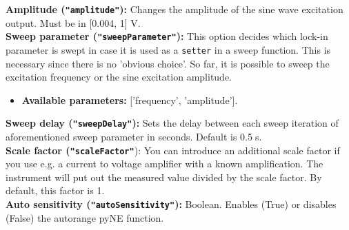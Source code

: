\textbf{\textsf{Amplitude} (\texttt{"amplitude"}):} Changes the amplitude of the sine wave excitation output. Must be in [0.004, 1] V.\\  
\textbf{\textsf{Sweep parameter} (\texttt{"sweepParameter"}):} This option decides which lock-in parameter is swept in case it is used as a \texttt{setter} in a sweep function. This is necessary since there is no 'obvious choice'. So far, it is possible to sweep the excitation frequency or the sine excitation amplitude.\\
\begin{itemize}[noitemsep]
\item \textbf{\textsf{Available parameters}: } ['frequency', 'amplitude'].
\end{itemize}
\textbf{\textsf{Sweep delay} (\texttt{"sweepDelay"}):} Sets the delay between each sweep iteration of aforementioned sweep parameter in seconds. Default is 0.5$\;$s.\\
\textbf{\textsf{Scale factor} (\texttt{"scaleFactor"}}): You can introduce an additional scale factor if you use e.g. a current to voltage amplifier with a known amplification. The instrument will put out the measured value divided by the scale factor. By default, this factor is 1.\\
\textbf{\textsf{Auto sensitivity} (\texttt{"autoSensitivity"}):} Boolean. Enables (True) or disables (False) the autorange pyNE function.\\
